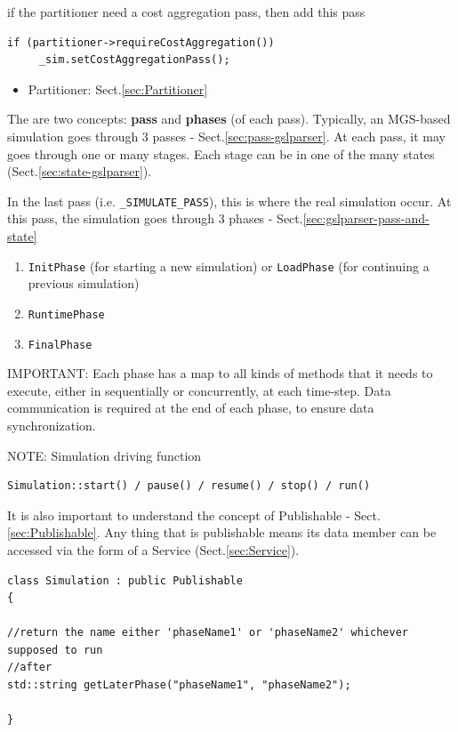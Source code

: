    \item if the partitioner need a cost aggregation pass, then add this pass
    
\begin{lstlisting}
if (partitioner->requireCostAggregation())
     _sim.setCostAggregationPass();
\end{lstlisting}
\begin{itemize}
  \item Partitioner: Sect.\ref{sec:Partitioner}
\end{itemize}


The are two concepts: {\bf pass} and {\bf phases} (of each
pass). Typically, an MGS-based simulation goes through 3
passes - Sect.\ref{sec:pass-gslparser}. At each pass, it may goes through one or
many stages. Each stage can be in one of the many states
(Sect.\ref{sec:state-gslparser}).

In the last pass (i.e. \verb!_SIMULATE_PASS!), this is where the real simulation
occur. At this pass, the simulation goes through 3 phases
- Sect.\ref{sec:gslparser-pass-and-state}
\begin{enumerate}
  \item \verb!InitPhase!  (for starting a new simulation) or \verb!LoadPhase!
  (for continuing a previous simulation) 
  
  \item \verb!RuntimePhase!
    
  \item \verb!FinalPhase!
\end{enumerate}

IMPORTANT: Each phase has  a map to all kinds of methods that it needs to
execute, either in sequentially or concurrently, at each time-step. Data
communication is required at the end of each phase, to ensure data
synchronization.

NOTE: Simulation driving function
\begin{verbatim}
Simulation::start() / pause() / resume() / stop() / run()
\end{verbatim}


It is also important to understand the concept of Publishable -
Sect.\ref{sec:Publishable}. Any thing that is publishable means its data member
can be accessed via the form of a Service (Sect.\ref{sec:Service}).

\begin{verbatim}
class Simulation : public Publishable
{

//return the name either 'phaseName1' or 'phaseName2' whichever supposed to run
//after
std::string getLaterPhase("phaseName1", "phaseName2");

}
\end{verbatim}

